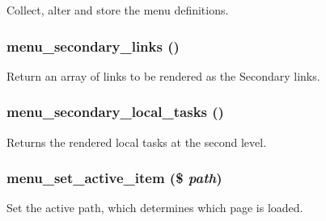 Collect, alter and store the menu definitions. \hypertarget{group__menu_gea7d8f0da28d4082b03e6cadf7af69bd}{
\subsubsection[{menu\_\-secondary\_\-links}]{\setlength{\rightskip}{0pt plus 5cm}menu\_\-secondary\_\-links ()}}
\label{group__menu_gea7d8f0da28d4082b03e6cadf7af69bd}


Return an array of links to be rendered as the Secondary links. \hypertarget{group__menu_gbf84c295da2c986cd8ad305935e31ffb}{
\subsubsection[{menu\_\-secondary\_\-local\_\-tasks}]{\setlength{\rightskip}{0pt plus 5cm}menu\_\-secondary\_\-local\_\-tasks ()}}
\label{group__menu_gbf84c295da2c986cd8ad305935e31ffb}


Returns the rendered local tasks at the second level. \hypertarget{group__menu_gcdd22102c2ba6545645ae34be563d1d4}{
\subsubsection[{menu\_\-set\_\-active\_\-item}]{\setlength{\rightskip}{0pt plus 5cm}menu\_\-set\_\-active\_\-item (\$ {\em path})}}
\label{group__menu_gcdd22102c2ba6545645ae34be563d1d4}


Set the active path, which determines which page is loaded.


